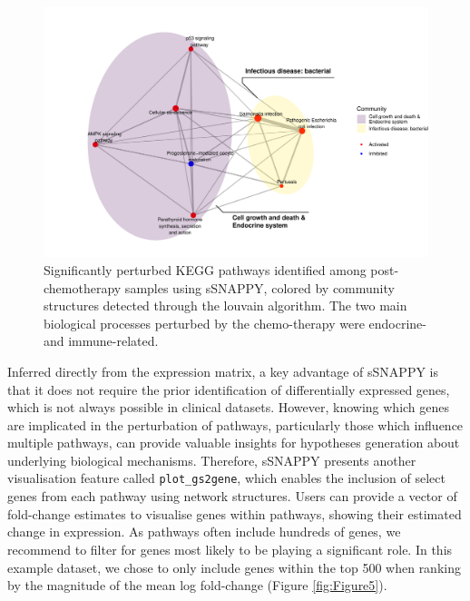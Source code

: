 \documentclass[9pt,a4paper,]{extarticle}
\newenvironment{Shaded}{\begin{snugshade}}{\end{snugshade}}
\newcommand{\DecValTok}[1]{\textcolor[rgb]{0.00,0.00,0.81}{#1}}
\newcommand{\FunctionTok}[1]{\textcolor[rgb]{0.00,0.00,0.00}{#1}}
\newcommand{\NormalTok}[1]{#1}
\newcommand{\OtherTok}[1]{\textcolor[rgb]{0.56,0.35,0.01}{#1}}
\newcommand{\SpecialCharTok}[1]{\textcolor[rgb]{0.00,0.00,0.00}{#1}}
\newcommand{\StringTok}[1]{\textcolor[rgb]{0.31,0.60,0.02}{#1}}
\begin{document}
\begin{figure}

{\centering \includegraphics[width=0.8\linewidth]{sSNAPPY_paper_files/figure-latex/Figure4-1} 

}

\caption{Significantly perturbed KEGG pathways identified among post-chemotherapy samples using sSNAPPY, colored by community structures detected through the louvain algorithm. The two main biological processes perturbed by the chemo-therapy were endocrine- and immune-related.}\label{fig:Figure4}
\end{figure}

Inferred directly from the expression matrix, a key advantage of sSNAPPY is that it does not require the prior identification of differentially expressed genes, which is not always possible in clinical datasets.
However, knowing which genes are implicated in the perturbation of pathways, particularly those which influence multiple pathways, can provide valuable insights for hypotheses generation about underlying biological mechanisms.
Therefore, sSNAPPY presents another visualisation feature called \texttt{plot\_gs2gene}, which enables the inclusion of select genes from each pathway using network structures.
Users can provide a vector of fold-change estimates to visualise genes within pathways, showing their estimated change in expression.
As pathways often include hundreds of genes, we recommend to filter for genes most likely to be playing a significant role.
In this example dataset, we chose to only include genes within the top 500 when ranking by the magnitude of the mean log fold-change (Figure \ref{fig:Figure5}).

\begin{Shaded}
\end{Shaded}
\end{document}
